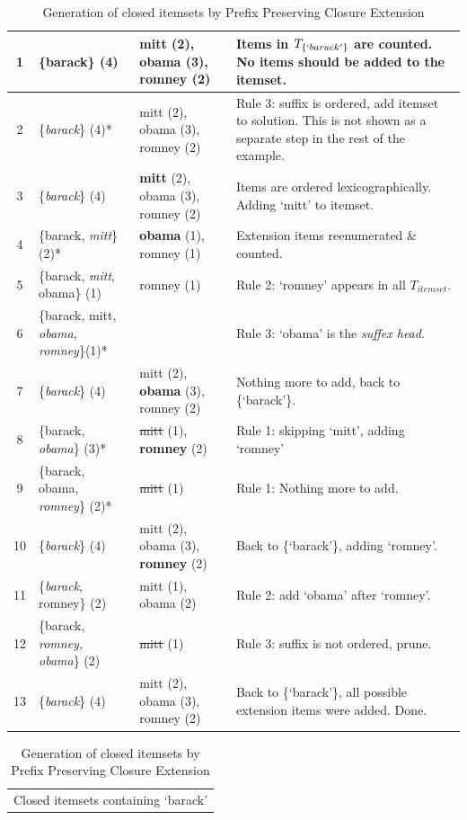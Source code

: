 \documentclass[letterpaper,12pt,titlepage,oneside,final]{book}
\begin{document}
\begin{landscape}
\begin{table}
\begin{tabular}{|c|p{6.5cm}|p{6cm}|p{7cm}|}
1& \{barack\} (4) & mitt (2), obama (3), romney (2) & {\small Items in $T_{\{`barack'\}}$ are counted. No items should be added to the itemset.}\\\hline %
2& \{\emph{barack}\} (4)* & mitt (2), obama (3), romney (2) &  {\small Rule 3: suffix is ordered, add itemset to solution. This is not shown as a separate step in the rest of the example. } \\ \hline
3& \{\emph{barack}\} (4) & \textbf{mitt} (2), obama (3), romney (2) &  {\small Items are ordered lexicographically. Adding `mitt' to itemset. } \\ \hline
4& \{barack, \emph{mitt}\} (2)* & \textbf{obama} (1), romney (1) &  {\small Extension items reenumerated \& counted.}\\\hline
5 & \{barack, \emph{mitt}, obama\} (1) & romney (1)                       &  {\small Rule 2: `romney' appears in all $T_{itemset}$. } \\\hline
6 & \{barack, mitt, \emph{obama, romney}\}(1)* & & {\small Rule 3: `obama'  is the \emph{suffex head}. } \\\hline
7 & \{\emph{barack}\} (4) & mitt (2), \textbf{obama} (3), romney (2) &  {\small Nothing more to add, back to \{`barack'\}.}\\\hline
8 & \{barack, \emph{obama}\} (3)* & \sout{mitt} (1), \textbf{romney} (2) &  {\small Rule 1: skipping `mitt', adding `romney'  } \\\hline
9 & \{barack, obama, \emph{romney}\} (2)* & \sout{mitt} (1) &  {\small Rule 1: Nothing more to add.  } \\\hline
10 & \{\emph{barack}\} (4) & mitt (2), obama (3), \textbf{romney} (2) &  {\small Back to \{`barack'\}, adding `romney'. } \\\hline
11 & \{\emph{barack}, romney\} (2) &  mitt (1), obama (2) &  {\small Rule 2: add `obama' after `romney'. } \\\hline
12 & \{barack, \emph{romney, obama}\} (2) &  \sout{mitt} (1)  &  {\small Rule 3: suffix is not ordered, prune.} \\\hline
13 & \{\emph{barack}\} (4) & mitt (2), obama (3), romney (2) &  {\small Back to \{`barack'\}, all possible extension items were added. Done. } \\\hline
\end{tabular}
\begin{tabular}{c}
Closed itemsets containing `barack'
\end{tabular}
\caption{Generation of closed itemsets by Prefix Preserving Closure Extension}
\label{table:PPCExample}
\end{table}
\end{landscape}
\end{document}
